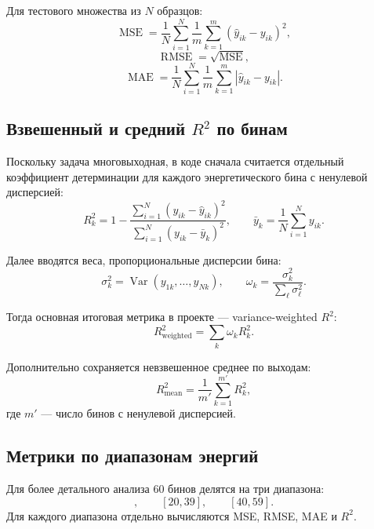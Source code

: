 \documentclass[11pt]{article}
\begin{document}
Для тестового множества из $N$ образцов:
\begin{equation}
\operatorname{MSE} = \frac{1}{N} \sum_{i=1}^{N} \frac{1}{m} \sum_{k=1}^{m} (\hat{y}_{ik} - y_{ik})^2,
\end{equation}
\begin{equation}
\operatorname{RMSE} = \sqrt{\operatorname{MSE}},
\end{equation}
\begin{equation}
\operatorname{MAE} = \frac{1}{N} \sum_{i=1}^{N} \frac{1}{m} \sum_{k=1}^{m} |\hat{y}_{ik} - y_{ik}|.
\end{equation}

\subsection{Взвешенный и средний \texorpdfstring{$R^2$}{R2} по бинам}

Поскольку задача многовыходная, в коде сначала считается отдельный коэффициент детерминации для каждого энергетического бина с ненулевой дисперсией:
\begin{equation}
R_k^2 = 1 - \frac{\sum_{i=1}^{N}(y_{ik} - \hat{y}_{ik})^2}{\sum_{i=1}^{N}(y_{ik} - \bar{y}_{k})^2},
\qquad
\bar{y}_k = \frac{1}{N} \sum_{i=1}^{N} y_{ik}.
\end{equation}

Далее вводятся веса, пропорциональные дисперсии бина:
\begin{equation}
\sigma_k^2 = \operatorname{Var}(y_{1k},\dots,y_{Nk}),
\qquad
\omega_k = \frac{\sigma_k^2}{\sum_{\ell} \sigma_{\ell}^2}.
\end{equation}

Тогда основная итоговая метрика в проекте --- variance-weighted $R^2$:
\begin{equation}
R^2_{\mathrm{weighted}} = \sum_{k} \omega_k R_k^2.
\end{equation}

Дополнительно сохраняется невзвешенное среднее по выходам:
\begin{equation}
R^2_{\mathrm{mean}} = \frac{1}{m'} \sum_{k=1}^{m'} R_k^2,
\end{equation}
где $m'$ --- число бинов с ненулевой дисперсией.

\subsection{Метрики по диапазонам энергий}

Для более детального анализа 60 бинов делятся на три диапазона:
\begin{equation}
[0,19], \qquad [20,39], \qquad [40,59].
\end{equation}
Для каждого диапазона отдельно вычисляются MSE, RMSE, MAE и $R^2$.
\end{document}

